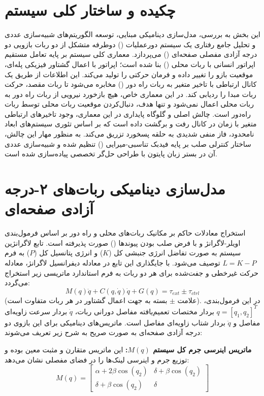 \documentclass[12pt]{report}
\begin{document}
\section{چکیده و ساختار کلی سیستم}
این بخش به بررسی، مدل‌سازی دینامیکی مبنایی، توسعه الگوریتم‌های شبیه‌سازی عددی و تحلیل جامع رفتاری یک سیستم دورعملیات () دوطرفه متشکل از دو ربات بازویی دو درجه آزادی مفصلی صفحه‌ای () می‌پردازد. معماری کلی سیستم بر پایه تعامل مستقیم اپراتور انسانی با ربات محلی () بنا شده است؛ اپراتور با اعمال گشتاور فیزیکی پله‌ای، موقعیت بازو را تغییر داده و فرمان حرکتی را تولید می‌کند. این اطلاعات از طریق یک کانال ارتباطی با تاخیر متغیر به ربات راه دور () مخابره می‌شود تا ربات مقصد، حرکت ربات مبدا را ردیابی کند. در این معماری خاص، هیچ بازخورد نیرویی از ربات راه دور به ربات محلی اعمال نمی‌شود و تنها هدف، دنبال‌کردن موقعیت ربات محلی توسط ربات راه‌دور است. چالش اصلی و گلوگاه پایداری در این معماری، وجود تاخیرهای ارتباطی متغیر با زمان در کانال رفت و برگشت داده است که بر اساس تئوری سیستم‌های ابعاد نامحدود، فاز منفی شدیدی به حلقه پسخورد تزریق می‌کند. به منظور مهار این چالش، ساختار کنترلی صلب بر پایه فیدبک تناسبی-میرایی () تنظیم شده و شبیه‌سازی عددی آن در بستر زبان پایتون با طراحی حل‌گر تخصصی پیاده‌سازی شده است.

\section{مدل‌سازی دینامیکی ربات‌های ۲-درجه آزادی صفحه‌ای}
استخراج معادلات حاکم بر مکانیک ربات‌های محلی و راه دور بر اساس فرمول‌بندی اویلر-لاگرانژ و با فرض صلب بودن پیوندها () صورت پذیرفته است. تابع لاگرانژین سیستم به صورت تفاضل انرژی جنبشی کل ($K$) و انرژی پتانسیل کل ($P$) به فرم $L = K - P$ توصیف می‌شود. با جایگذاری این تابع در معادله دیفرانسیل لاگرانژ، معادله حرکت غیرخطی و جفت‌شده برای هر دو ربات به فرم استاندارد ماتریسی زیر استخراج می‌گردد:
\[ M(q)\ddot{q} + C(q, \dot{q})\dot{q} + G(q) = \tau_{ext} \pm \tau_{ctrl} \]
(علامت $\pm$ بسته به جهت اعمال گشتاور در هر ربات متفاوت است). در این فرمول‌بندی، $q = [q_1, q_2]^T$ بردار مختصات تعمیم‌یافته مفاصل دورانی ربات، $\dot{q}$ بردار سرعت زاویه‌ای مفاصل و $\ddot{q}$ بردار شتاب زاویه‌ای مفاصل است. ماتریس‌های دینامیکی برای این بازوی دو درجه آزادی صفحه‌ای به صورت صریح به شرح زیر تعریف می‌شوند:

\textbf{ماتریس اینرسی جرم کل سیستم $M(q)$:}
این ماتریس متقارن و مثبت معین بوده و توزیع جرم و اینرسی لینک‌ها را در فضای مفصلی نشان می‌دهد:
\[ M(q) = \begin{bmatrix} \alpha + 2\beta \cos(q_2) & \delta + \beta \cos(q_2) \\ \delta + \beta \cos(q_2) & \delta \end{bmatrix} \]
\end{document}
